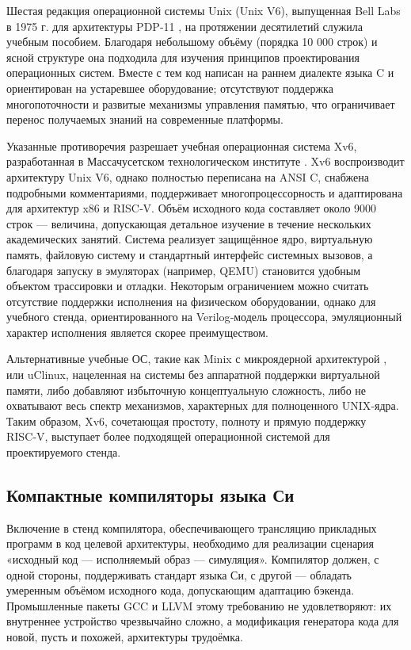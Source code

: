 Шестая редакция операционной системы Unix (Unix V6), выпущенная Bell Labs в 1975 г. для архитектуры PDP‑11 \cite{V6}, на протяжении десятилетий служила учебным пособием. Благодаря небольшому объёму (порядка 10 000 строк) и ясной структуре она подходила для изучения принципов проектирования операционных систем. Вместе с тем код написан на раннем диалекте языка C и ориентирован на устаревшее оборудование; отсутствуют поддержка многопоточности и развитые механизмы управления памятью, что ограничивает перенос получаемых знаний на современные платформы.

Указанные противоречия разрешает учебная операционная система Xv6, разработанная в Массачусетском технологическом институте \cite{Xv6}. Xv6 воспроизводит архитектуру Unix V6, однако полностью переписана на ANSI C, снабжена подробными комментариями, поддерживает многопроцессорность и адаптирована для архитектур x86 и RISC‑V. Объём исходного кода составляет около 9000 строк — величина, допускающая детальное изучение в течение нескольких академических занятий. Система реализует защищённое ядро, виртуальную память, файловую систему и стандартный интерфейс системных вызовов, а благодаря запуску в эмуляторах (например, QEMU) становится удобным объектом трассировки и отладки. Некоторым ограничением можно считать отсутствие поддержки исполнения на физическом оборудовании, однако для учебного стенда, ориентированного на Verilog‑модель процессора, эмуляционный характер исполнения является скорее преимуществом.

Альтернативные учебные ОС, такие как Minix с микроядерной архитектурой \cite{Minix}, или uClinux, нацеленная на системы без аппаратной поддержки виртуальной памяти, либо добавляют избыточную концептуальную сложность, либо не охватывают весь спектр механизмов, характерных для полноценного UNIX‑ядра. Таким образом, Xv6, сочетающая простоту, полноту и прямую поддержку RISC‑V, выступает более подходящей операционной системой для проектируемого стенда.

\subsection{Компактные компиляторы языка Си}

Включение в стенд компилятора, обеспечивающего трансляцию прикладных программ в код целевой архитектуры, необходимо для реализации сценария «исходный код — исполняемый образ — симуляция». Компилятор должен, с одной стороны, поддерживать стандарт языка Си, с другой — обладать умеренным объёмом исходного кода, допускающим адаптацию бэкенда. Промышленные пакеты GCC и LLVM этому требованию не удовлетворяют: их внутреннее устройство чрезвычайно сложно, а модификация генератора кода для новой, пусть и похожей, архитектуры трудоёмка.

